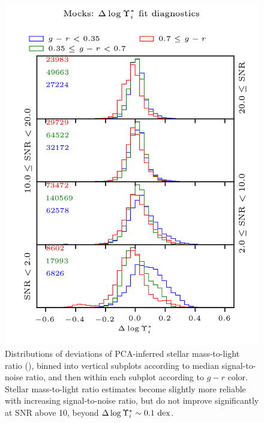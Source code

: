 \begin{figure}
    \centering
    \includegraphics[width=5in]{mocks_snr_color_hist_devMLi}
    \caption[Reliability of  versus color and signal-to-noise]{\fixspacing Distributions of deviations of PCA-inferred stellar mass-to-light ratio (), binned into vertical subplots according to median signal-to-noise ratio, and then within each subplot according to $g-r$ color. Stellar mass-to-light ratio estimates become slightly more reliable with increasing signal-to-noise ratio, but do not improve significantly at SNR above 10, beyond $\Delta \log \Upsilon^*_{i} \sim 0.1~{\rm dex}$.}
    \label{fig:mocks_snr_color_hist_devMLi}
\end{figure}


